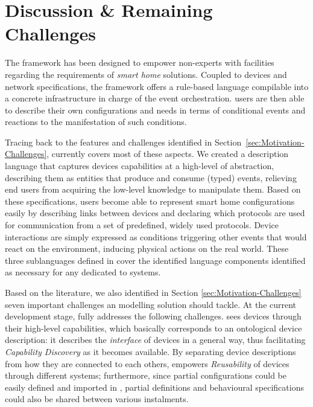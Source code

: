 \section{Discussion \& Remaining Challenges}
\label{sec:Discussion}

The \IOTDSL framework has been designed to empower non-experts with facilities regarding the requirements of \textit{smart home} \IOT solutions. Coupled to \IOT devices and network specifications, the framework offers a rule-based language compilable into a concrete \CEP infrastructure in charge of the event orchestration. \IOTDSL users are then able to describe their own configurations and needs in terms of conditional events and reactions to the manifestation of such conditions.

Tracing back to the features and challenges identified in Section~\ref{sec:Motivation-Challenges}, \IOTDSL currently covers most of these aspects. We created a description language that captures devices capabilities at a high-level of abstraction, describing them as entities that produce and consume (typed) events, relieving end users from acquiring the low-level knowledge to manipulate them. Based on these specifications, users become able to represent smart home configurations easily by describing links between devices and declaring which protocols are used for communication from a set of predefined, widely used protocols. Device interactions are simply expressed as conditions triggering other events that would react on the environment, inducing physical actions on the real world. These three sublanguages defined in \IOTDSL cover the identified language components identified as necessary for any \DSL dedicated to \IOT systems.


Based on the literature, we also identified in Section \ref{sec:Motivation-Challenges} seven important challenges an \IOT modelling solution should tackle. At the current development stage, \IOTDSL fully addresses the following challenges. \IOTDSL sees devices through their high-level capabilities, which basically corresponds to an ontological device description: it describes the \emph{interface} of devices in a general way, thus facilitating \emph{Capability Discovery} as it becomes available. By separating device descriptions from how they are connected to each others, \IOTDSL empowers \emph{Reusability} of devices through different \IOT systems; furthermore, since partial configurations could be easily defined and imported in \IOTDSL, partial definitions and behavioural specifications could also be shared between various instalments. 


